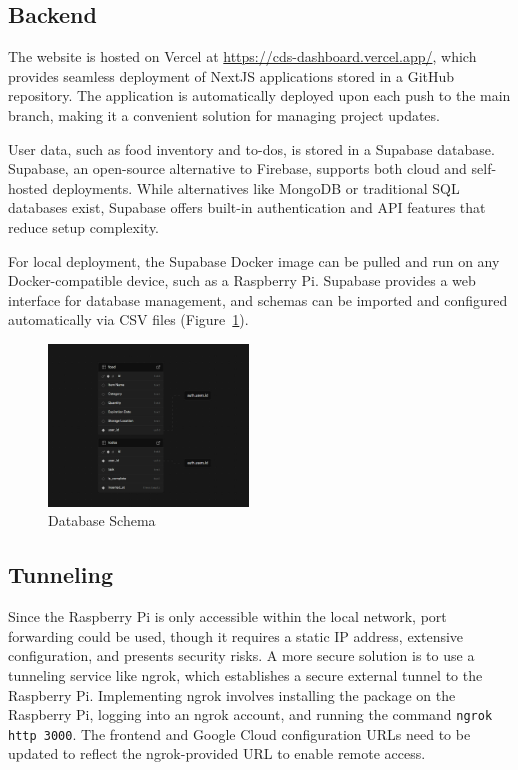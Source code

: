 \subsection{Backend}
The website is hosted on Vercel at \url{https://cds-dashboard.vercel.app/}, which provides seamless deployment of NextJS applications stored in a GitHub repository. The application is automatically deployed upon each push to the main branch, making it a convenient solution for managing project updates.

User data, such as food inventory and to-dos, is stored in a Supabase database. Supabase, an open-source alternative to Firebase, supports both cloud and self-hosted deployments. While alternatives like MongoDB or traditional SQL databases exist, Supabase offers built-in authentication and API features that reduce setup complexity.

For local deployment, the Supabase Docker image can be pulled and run on any Docker-compatible device, such as a Raspberry Pi. Supabase provides a web interface for database management, and schemas can be imported and configured automatically via CSV files (Figure~\ref{fig:schema}).

\begin{figure}[H]
\centering
\includegraphics[width=0.475\textwidth]{media/database.png}
\caption{Database Schema}
\label{fig:schema}
\end{figure}

\subsection{Tunneling}
Since the Raspberry Pi is only accessible within the local network, port forwarding could be used, though it requires a static IP address, extensive configuration, and presents security risks. A more secure solution is to use a tunneling service like ngrok, which establishes a secure external tunnel to the Raspberry Pi. Implementing ngrok involves installing the package on the Raspberry Pi, logging into an ngrok account, and running the command \texttt{ngrok http 3000}. The frontend and Google Cloud configuration URLs need to be updated to reflect the ngrok-provided URL to enable remote access.
